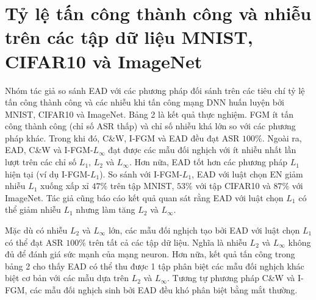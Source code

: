 \section{Tỷ lệ tấn công thành công và nhiễu trên các tập dữ liệu MNIST, CIFAR10 và ImageNet}
Nhóm tác giả so sánh EAD với các phương pháp đối sánh trên các tiêu chí tỷ lệ tấn công thành công và các nhiễu khi tấn công mạng DNN huấn luyện bởi MNIST, CIFAR10 và ImageNet. Bảng 2 là kết quả thực nghiệm. FGM ít tấn công thành công (chỉ số ASR thấp) và chỉ số nhiễu khá lớn so với các phương pháp khác. Trong khi đó, C\&W, I-FGM và EAD đều đạt ASR $100\%$. Ngoài ra, EAD, C\&W và I-FGM-$L_{\infty}$ đạt được các mẫu đối nghịch với ít nhiễu nhất lần lượt trên các chỉ số  $L_1$, $L_2$ và $L_{\infty}$. Hơn nữa, EAD tốt hơn các phương pháp $L_1$ hiện tại (ví dụ I-FGM-$L_1$). So sánh với I-FGM-$L_1$, EAD với luật chọn EN giảm nhiễu $L_1$ xuống xấp xỉ $47\%$ trên tập MNIST, $53\%$ với tập CIFAR10 và $87\%$ với ImageNet. Tác giả cũng báo cáo kết quả quan sát rằng EAD với luật chọn $L_1$ có thể giảm nhiễu $L_1$ nhưng làm tăng $L_2$ và $L_{\infty}$.

Mặc dù có nhiễu $L_2$ và $L_{\infty}$ lớn, các mẫu đối nghịch tạo bởi EAD với luật chọn $L_1$ có thể đạt ASR $100\%$ trên tất cả các tập dữ liệu. Nghĩa là nhiễu $L_2$ và $L_{\infty}$ không đủ để đánh giá sức mạnh của mạng neuron. Hơn nữa, kết quả tấn công trong bảng 2 cho thấy EAD có thể thu được 1 tập phân biệt các mẫu đối nghịch khác biệt cơ bản với các mẫu dựa trên $L_2$ và $L_{\infty}$. Tương tự phương pháp C\&W và I-FGM, các mẫu đối nghịch sinh bởi EAD đều khó phân biệt bằng mắt thường. 
